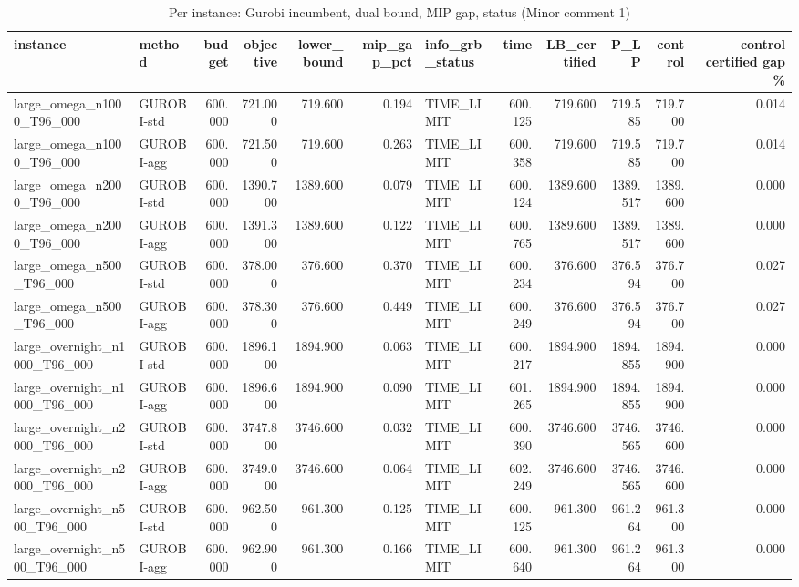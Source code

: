 \begin{table}[htbp]
\centering
\small
\caption{Per instance: Gurobi incumbent, dual bound, MIP gap, status (Minor comment 1)}
\label{tab:E3_long_runs_gurobi_per_instance}
\begin{tabular}{llrrrrlrrrrr}
\toprule
instance & method & budget & objective & lower\_bound & mip\_gap\_pct & info\_grb\_status & time & LB\_certified & P\_LP & control & control certified gap \% \\
\midrule
large\_omega\_n1000\_T96\_000 & GUROBI-std & 600.000 & 721.000 & 719.600 & 0.194 & TIME\_LIMIT & 600.125 & 719.600 & 719.585 & 719.700 & 0.014 \\
large\_omega\_n1000\_T96\_000 & GUROBI-agg & 600.000 & 721.500 & 719.600 & 0.263 & TIME\_LIMIT & 600.358 & 719.600 & 719.585 & 719.700 & 0.014 \\
large\_omega\_n2000\_T96\_000 & GUROBI-std & 600.000 & 1390.700 & 1389.600 & 0.079 & TIME\_LIMIT & 600.124 & 1389.600 & 1389.517 & 1389.600 & 0.000 \\
large\_omega\_n2000\_T96\_000 & GUROBI-agg & 600.000 & 1391.300 & 1389.600 & 0.122 & TIME\_LIMIT & 600.765 & 1389.600 & 1389.517 & 1389.600 & 0.000 \\
large\_omega\_n500\_T96\_000 & GUROBI-std & 600.000 & 378.000 & 376.600 & 0.370 & TIME\_LIMIT & 600.234 & 376.600 & 376.594 & 376.700 & 0.027 \\
large\_omega\_n500\_T96\_000 & GUROBI-agg & 600.000 & 378.300 & 376.600 & 0.449 & TIME\_LIMIT & 600.249 & 376.600 & 376.594 & 376.700 & 0.027 \\
large\_overnight\_n1000\_T96\_000 & GUROBI-std & 600.000 & 1896.100 & 1894.900 & 0.063 & TIME\_LIMIT & 600.217 & 1894.900 & 1894.855 & 1894.900 & 0.000 \\
large\_overnight\_n1000\_T96\_000 & GUROBI-agg & 600.000 & 1896.600 & 1894.900 & 0.090 & TIME\_LIMIT & 601.265 & 1894.900 & 1894.855 & 1894.900 & 0.000 \\
large\_overnight\_n2000\_T96\_000 & GUROBI-std & 600.000 & 3747.800 & 3746.600 & 0.032 & TIME\_LIMIT & 600.390 & 3746.600 & 3746.565 & 3746.600 & 0.000 \\
large\_overnight\_n2000\_T96\_000 & GUROBI-agg & 600.000 & 3749.000 & 3746.600 & 0.064 & TIME\_LIMIT & 602.249 & 3746.600 & 3746.565 & 3746.600 & 0.000 \\
large\_overnight\_n500\_T96\_000 & GUROBI-std & 600.000 & 962.500 & 961.300 & 0.125 & TIME\_LIMIT & 600.125 & 961.300 & 961.264 & 961.300 & 0.000 \\
large\_overnight\_n500\_T96\_000 & GUROBI-agg & 600.000 & 962.900 & 961.300 & 0.166 & TIME\_LIMIT & 600.640 & 961.300 & 961.264 & 961.300 & 0.000 \\

\end{tabular}
\end{table}
